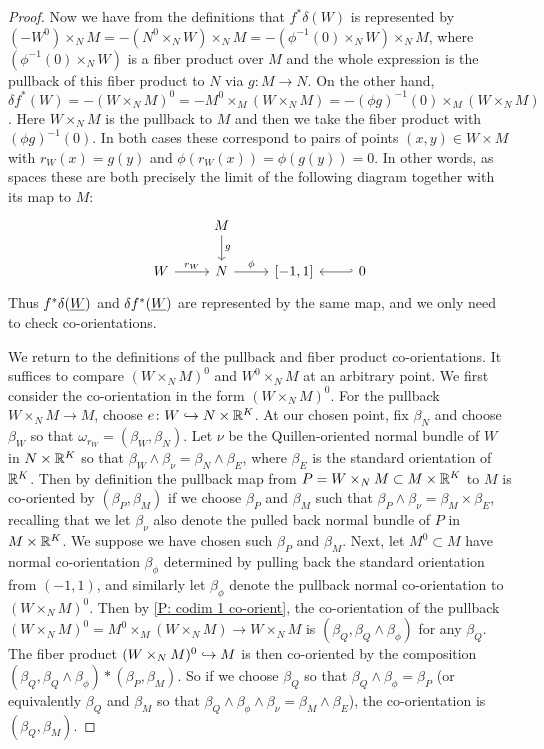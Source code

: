 \begin{proof}
	Now we have from the definitions that $f^*\delta(W)$ is represented by $(-W^0) \times_N M = -(N^0 \times_N W) \times_N M = -(\phi^{-1}(0) \times_N W) \times_N M$, where $(\phi^{-1}(0) \times_N W)$ is a fiber product over $M$ and the whole expression is the pullback of this fiber product to $N$ via $g \colon M \to N$.
	On the other hand, $\delta f^*(W) = -(W \times_N M)^0 = -M^0 \times_M (W \times_N M) = -(\phi g)^{-1}(0) \times_M (W \times_N M)$.
	Here $W \times_N M$ is the pullback to $M$ and then we take the fiber product with $(\phi g)^{-1}(0)$.
	In both cases these correspond to pairs of points $(x,y) \in W \times M$ with $r_W(x) = g(y)$ and $\phi(r_W(x)) = \phi(g(y)) = 0$.
	In other words, as spaces these are both precisely the limit of the following diagram together with its map to $M$:
	\[
	\begin{tikzcd}
		& M \arrow[d,"g"] & \\
		W \arrow[r, "r_W"] & N \arrow[r, "\phi"] & {[-1,1]} & \arrow[l,hook'] 0
	\end{tikzcd}
	\]
	Thus $f^*\delta(\underline{W})$ and $\delta f^*(\underline{W})$ are represented by the same map, and we only need to check co-orientations.

	We return to the definitions of the pullback and fiber product co-orientations.
	It suffices to compare $(W \times_N M)^0$ and $W^0 \times_N M$ at an arbitrary point.
	We first consider the co-orientation in the form $(W \times_N M)^0$.
	For the pullback $W \times_N M \to M$, choose $e \colon W \hookrightarrow N \times \mathbb{R}^K$.
	At our chosen point, fix $\beta_N$ and choose $\beta_W$ so that $\omega_{r_W} = (\beta_W,\beta_N)$.
	Let $\nu$ be the Quillen-oriented normal bundle of $W$ in $N \times \mathbb{R}^K$ so that $\beta_W \wedge \beta_\nu = \beta_N \wedge \beta_E$, where $\beta_E$ is the standard orientation of $\mathbb{R}^K$.
	Then by definition the pullback map from $P = W \times_N M \subset M \times \mathbb{R}^K$ to $M$ is co-oriented by $(\beta_P,\beta_M)$ if we choose $\beta_P$ and $\beta_M$ such that $\beta_P \wedge \beta_\nu = \beta_M \times \beta_E$, recalling that we let $\beta_\nu$ also denote the pulled back normal bundle of $P$ in $M \times \mathbb{R}^K$.
	We suppose we have chosen such $\beta_P$ and $\beta_M$.
	Next, let $M^0 \subset M$ have normal co-orientation $\beta_\phi$ determined by pulling back the standard orientation from $(-1,1)$, and similarly let $\beta_\phi$ denote the pullback normal co-orientation to $(W \times_N M)^0$.
	Then by \cref{P: codim 1 co-orient}, the co-orientation of the pullback $(W \times_N M)^0 = M^0 \times_M (W \times_N M) \to W \times_N M$ is $(\beta_Q,\beta_Q \wedge \beta_\phi)$ for any $\beta_Q$.
	The fiber product $(W \times_N M)^0 \hookrightarrow M$ is then co-oriented by the composition $(\beta_Q,\beta_Q \wedge \beta_\phi)*(\beta_P,\beta_M)$.
	So if we choose $\beta_Q$ so that $\beta_Q \wedge \beta_\phi = \beta_P$ (or equivalently $\beta_Q$ and $\beta_M$ so that $\beta_Q \wedge \beta_\phi \wedge \beta_\nu = \beta_M \wedge \beta_E$), the co-orientation is $(\beta_Q,\beta_M)$.


\end{proof}
